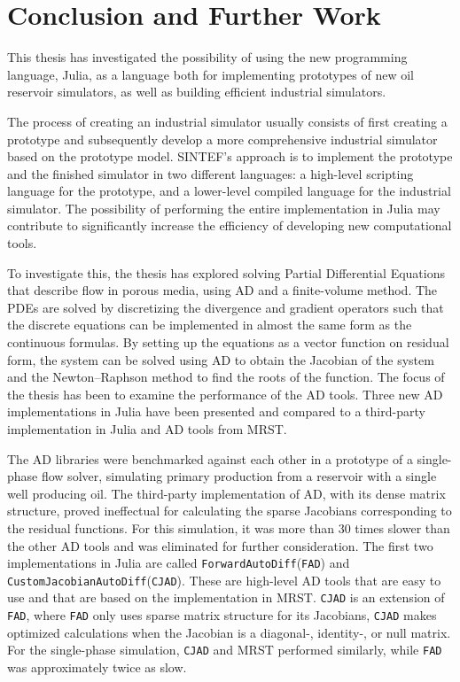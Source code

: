 \chapter{Conclusion and Further Work}
\label{ch:Conclusion}
This thesis has investigated the possibility of using the new programming language, Julia, as a language both for implementing prototypes of new oil reservoir simulators, as well as building efficient industrial simulators. 

The process of creating an industrial simulator usually consists of first creating a prototype and subsequently develop a more comprehensive industrial simulator based on the prototype model. SINTEF's approach is to implement the prototype and the finished simulator in two different languages: a high-level scripting language for the prototype, and a lower-level compiled language for the industrial simulator. The possibility of performing the entire implementation in Julia may contribute to significantly increase the efficiency of developing new computational tools.

To investigate this, the thesis has explored solving Partial Differential Equations that describe flow in porous media, using AD and a finite-volume method. The PDEs are solved by discretizing the divergence and gradient operators such that the discrete equations can be implemented in almost the same form as the continuous formulas. By setting up the equations as a vector function on residual form, the system can be solved using AD to obtain the Jacobian of the system and the Newton--Raphson method to find the roots of the function. The focus of the thesis has been to examine the performance of the AD tools. Three new AD implementations in Julia have been presented and compared to a third-party implementation in Julia and AD tools from MRST. 

The AD libraries were benchmarked against each other in a prototype of a single-phase flow solver, simulating primary production from a reservoir with a single well producing oil. The third-party implementation of AD, with its dense matrix structure, proved ineffectual for calculating the sparse Jacobians corresponding to the residual functions. For this simulation, it was more than 30 times slower than the other AD tools and was eliminated for further consideration. The first two implementations in Julia are called \texttt{ForwardAutoDiff}(\texttt{FAD}) and \texttt{CustomJacobianAutoDiff}(\texttt{CJAD}). These are high-level AD tools that are easy to use and that are based on the implementation in MRST. \texttt{CJAD} is an extension of \texttt{FAD}, where \texttt{FAD} only uses sparse matrix structure for its Jacobians, \texttt{CJAD} makes optimized calculations when the Jacobian is a diagonal-, identity-, or null matrix. For the single-phase simulation, \texttt{CJAD} and MRST performed similarly, while \texttt{FAD} was approximately twice as slow. 

